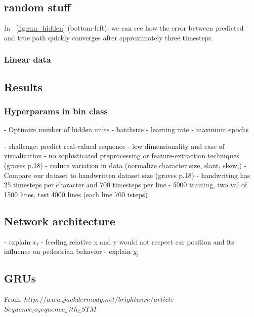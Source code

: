 
\subsection{random stuff}


In ~\cref{fig:rnn_hidden} (bottom-left), we can see how the error between predicted and true path quickly converges after approximately three timesteps.


\subsubsection{Linear data}

\subsection{Results}



\subsubsection{Hyperparams in bin class}
- Optimize number of hidden units
- batchsize
- learning rate
- maximum epochs


 


- challenge: predict real-valued sequence
- low dimensionality and ease of visualization
- no sophisticated preprocessing or feature-extraction techniques (graves p.18)
	- reduce variation in data (normalize character size, slant, skew,)
- Compare our dataset to handwritten dataset size (graves p.18)
- handwriting has 25 timesteps per character and 700 timesteps per line
- 5000 training, two val of 1500 lines, test 4000 lines (each line 700 tsteps)

\subsection{Network architecture}
- explain $x_t$
	- feeding relative x and y would not respect car position and its influence on pedestrian behavior
- explain $y_t$

\subsection{GRUs}
From: $http://www.jackdermody.net/brightwire/article$
$Sequence_to_Sequence_with_LSTM$

